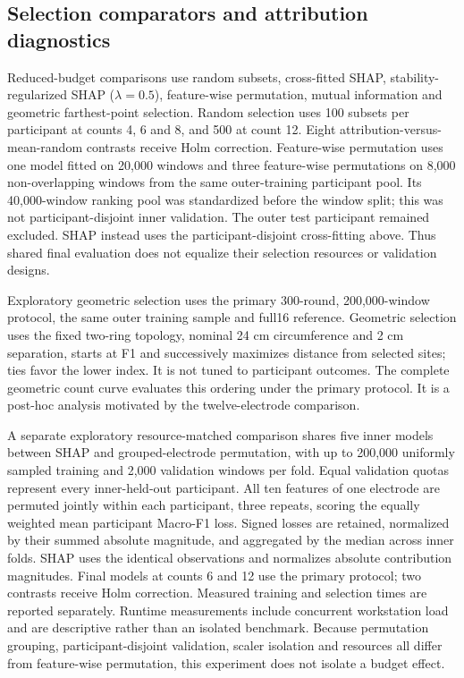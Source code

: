 \subsection{Selection comparators and attribution diagnostics}
Reduced-budget comparisons use random subsets, cross-fitted SHAP, stability-regularized SHAP ($\lambda=0.5$), feature-wise permutation, mutual information and geometric farthest-point selection. Random selection uses 100 subsets per participant at counts 4, 6 and 8, and 500 at count 12. Eight attribution-versus-mean-random contrasts receive Holm correction. Feature-wise permutation uses one model fitted on 20,000 windows and three feature-wise permutations on 8,000 non-overlapping windows from the same outer-training participant pool. Its 40,000-window ranking pool was standardized before the window split; this was not participant-disjoint inner validation. The outer test participant remained excluded. SHAP instead uses the participant-disjoint cross-fitting above. Thus shared final evaluation does not equalize their selection resources or validation designs.

Exploratory geometric selection uses the primary 300-round, 200,000-window protocol, the same outer training sample and full16 reference. Geometric selection uses the fixed two-ring topology, nominal 24 cm circumference and 2 cm separation, starts at F1 and successively maximizes distance from selected sites; ties favor the lower index. It is not tuned to participant outcomes. The complete geometric count curve evaluates this ordering under the primary protocol. It is a post-hoc analysis motivated by the twelve-electrode comparison.

A separate exploratory resource-matched comparison shares five inner models between SHAP and grouped-electrode permutation, with up to 200,000 uniformly sampled training and 2,000 validation windows per fold. Equal validation quotas represent every inner-held-out participant. All ten features of one electrode are permuted jointly within each participant, three repeats, scoring the equally weighted mean participant Macro-F1 loss. Signed losses are retained, normalized by their summed absolute magnitude, and aggregated by the median across inner folds. SHAP uses the identical observations and normalizes absolute contribution magnitudes. Final models at counts 6 and 12 use the primary protocol; two contrasts receive Holm correction. Measured training and selection times are reported separately. Runtime measurements include concurrent workstation load and are descriptive rather than an isolated benchmark. Because permutation grouping, participant-disjoint validation, scaler isolation and resources all differ from feature-wise permutation, this experiment does not isolate a budget effect.

